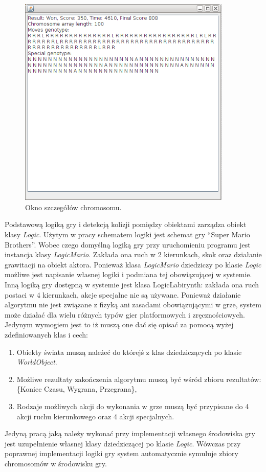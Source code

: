 \begin{par}
	\begin{figure}[!h]
		\centering
		\includegraphics[width=4in]{obrazki/chromosom.png}
		\caption{Okno szczegółów chromosomu.}
		\label{fig:chromosom}
	\end{figure}
	\FloatBarrier
\end{par}
\begin{par}
	Podstawową logiką gry i detekcją kolizji pomiędzy obiektami zarządza obiekt klasy \textit{Logic}. Użytym w pracy schematem logiki jest schemat gry ``Super Mario Brothers''. Wobec czego domyślną logiką gry przy uruchomieniu programu jest instancja klasy \textit{LogicMario}.
	Zakłada ona ruch w 2 kierunkach, skok oraz działanie grawitacji na obiekt aktora.
	Ponieważ klasa \textit{LogicMario} dziedziczy po klasie \textit{Logic} możliwe jest napisanie własnej logiki i podmiana tej obowiązującej w systemie.
	Inną logiką gry dostępną w systemie jest klasa LogicLabirynth: zakłada ona ruch postaci w 4 kierunkach, akcje specjalne nie są używane.
	Ponieważ działanie algorytmu nie jest związane z fizyką ani zasadami obowiązującymi w grze, system może działać dla wielu różnych typów gier platformowych i zręcznościowych.
	Jedynym wymogiem jest to iż muszą one dać się opisać za pomocą wyżej zdefiniowanych klas i cech:
	\begin{enumerate}
		\item
			Obiekty świata muszą należeć do którejś z klas dziedziczących po klasie \textit{WorldObject}.
		\item 
			Możliwe rezultaty zakończenia algorytmu muszą być wśród zbioru rezultatów: \{Koniec Czasu, Wygrana, Przegrana\}, 
		\item
			Rodzaje możliwych akcji do wykonania w grze muszą być przypisane do 4 akcji ruchu kierunkowego oraz 4 akcji specjalnych.
	\end{enumerate}

	Jedyną pracą jaką należy wykonać przy implementacji własnego środowiska gry jest uzupełnienie własnej klasy dziedziczącej po klasie \textit{Logic}.
	Wówczas przy poprawnej implementacji logiki gry system automatycznie symuluje zbiory chromosomów w środowisku gry.
\end{par}

